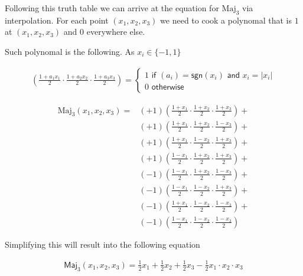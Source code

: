 \documentclass[12pt, a4paper, onecolumn]{exam}
\begin{document}
\begin{questions}
\begin{parts}
\begin{solution}
			Following this truth table we can arrive at the equation for $\text{Maj}_3$ via
			interpolation. For each point $(x_1, x_2, x_3)$ we need to cook a polynomal
			that is $1$ at $(x_1, x_2, x_3)$ and $0$ everywhere else.

			Such polynomal is the following. As $x_i \in \{-1,1\}$

			\begin{align*}
				\left( \frac{1 + a_1 x_1}{2} \cdot \frac{1 + a_2 x_2}{2} \cdot \frac{1 + a_3 x_3}{2} \right) =
				\begin{cases}
					1 \textsf{ if } (a_i) = \textsf{sgn}(x_i) \textsf{ and } x_i  = |x_i| \\
					0 \textsf{ otherwise}
				\end{cases}
			\end{align*}

			\begin{align*}
				\text{Maj}_3(x_1, x_2, x_3) =
				 & (+1) \left( \frac{1 + x_1}{2} \cdot \frac{1 + x_2}{2} \cdot \frac{1 + x_3}{2} \right) + \\
				 & (+1) \left( \frac{1 + x_1}{2} \cdot \frac{1 + x_2}{2} \cdot \frac{1 - x_3}{2} \right) + \\
				 & (+1) \left( \frac{1 + x_1}{2} \cdot \frac{1 - x_2}{2} \cdot \frac{1 + x_3}{2} \right) + \\
				 & (+1) \left( \frac{1 - x_1}{2} \cdot \frac{1 + x_2}{2} \cdot \frac{1 + x_3}{2} \right) + \\
				 & (-1) \left( \frac{1 - x_1}{2} \cdot \frac{1 + x_2}{2} \cdot \frac{1 - x_3}{2} \right) + \\
				 & (-1) \left( \frac{1 - x_1}{2} \cdot \frac{1 - x_2}{2} \cdot \frac{1 + x_3}{2} \right) + \\
				 & (-1) \left( \frac{1 + x_1}{2} \cdot \frac{1 - x_2}{2} \cdot \frac{1 - x_3}{2} \right) + \\
				 & (-1) \left( \frac{1 - x_1}{2} \cdot \frac{1 - x_2}{2} \cdot \frac{1 - x_3}{2} \right)
			\end{align*}

			Simplifying this will result into the following equation

			\begin{align*}
				\textsf{Maj}_3(x_1, x_2, x_3) = \frac{1}{2} x_1 + \frac{1}{2} x_2 + \frac{1}{2} x_3 - \frac{1}{2} x_1 \cdot x_2 \cdot x_3
			\end{align*}

		\end{solution}


\end{parts}
\end{questions}
\end{document}

